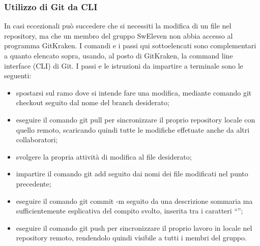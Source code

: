 \subsubsection{Utilizzo di Git da CLI}
In casi eccezionali può succedere che si necessiti la modifica di un file nel repository, ma che un membro del gruppo SwEleven non abbia accesso al programma GitKraken. I comandi e i passi qui sottoelencati sono complementari a quanto elencato sopra, usando, al posto di GitKraken, la command line interface (CLI) di Git. I passi e le istruzioni da impartire a terminale sono le seguenti:
\begin{itemize}
	\item spostarsi sul ramo dove si intende fare una modifica, mediante comando git checkout seguito dal nome del branch desiderato;
	\item eseguire il comando git pull per sincronizzare il proprio repository locale con quello remoto, scaricando quindi tutte le modifiche effetuate anche da altri collaboratori;
	\item svolgere la propria attività di modifica al file desiderato;
	\item impartire il comando git add seguito dai nomi dei file modificati nel punto precedente;
	\item eseguire il comando git commit -m seguito da una descrizione sommaria ma sufficientemente esplicativa del compito svolto, inserita tra i caratteri “”;
	\item eseguire il comando git push per sincronizzare il proprio lavoro in locale nel repository remoto, rendendolo quindi visibile a tutti i membri del gruppo.
\end{itemize}


